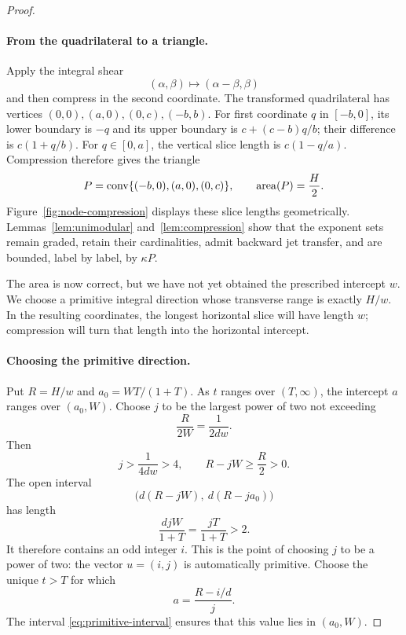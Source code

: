 \begin{proof}
\paragraph{From the quadrilateral to a triangle.}
Apply the integral shear
\[
 (\alpha,\beta)\longmapsto(\alpha-\beta,\beta)
\]
and then compress in the second coordinate.  The transformed quadrilateral
has vertices $(0,0),(a,0),(0,c),(-b,b)$.  For first coordinate $q$ in
$[-b,0]$, its lower boundary is $-q$ and its upper boundary is
$c+(c-b)q/b$; their difference is $c(1+q/b)$.  For $q\in[0,a]$, the
vertical slice length is $c(1-q/a)$.  Compression therefore gives the
triangle
\begin{equation}\label{eq:compressed-triangle}
 P=\operatorname{conv}\{(-b,0),(a,0),(0,c)\},\qquad
 \operatorname{area}(P)=\frac H2.
\end{equation}
Figure~\ref{fig:node-compression} displays these slice lengths geometrically.
Lemmas~\ref{lem:unimodular} and~\ref{lem:compression} show that the exponent
sets remain graded, retain their cardinalities, admit backward jet
transfer, and are bounded, label by label, by $\kappa P$.

\ReshapingNodeFigure

The area is now correct, but we have not yet obtained the prescribed
intercept $w$.  We choose a primitive integral direction whose transverse
range is exactly $H/w$.  In the resulting coordinates, the longest
horizontal slice will have length $w$; compression will turn that length
into the horizontal intercept.

\paragraph{Choosing the primitive direction.}
Put $R=H/w$ and $a_0=WT/(1+T)$.  As $t$ ranges over $(T,\infty)$,
the intercept $a$ ranges over $(a_0,W)$.  Choose $j$ to be the largest
power of two not exceeding
\[
 \frac{R}{2W}=\frac{1}{2dw}.
\]
Then
\begin{equation}\label{eq:primitive-j}
 j>\frac{1}{4dw}>4,
 \qquad R-jW\ge\frac R2>0.
\end{equation}
The open interval
\begin{equation}\label{eq:primitive-interval}
 \bigl(d(R-jW),\ d(R-ja_0)\bigr)
\end{equation}
has length
\[
 \frac{djW}{1+T}=\frac{jT}{1+T}>2.
\]
It therefore contains an odd integer $i$.  This is the point of choosing
$j$ to be a power of two: the vector $u=(i,j)$ is automatically primitive.
Choose the unique $t>T$ for which
\begin{equation}\label{eq:tuned-intercept}
 a=\frac{R-i/d}{j}.
\end{equation}
The interval \eqref{eq:primitive-interval} ensures that this value lies in
$(a_0,W)$.


\end{proof}
